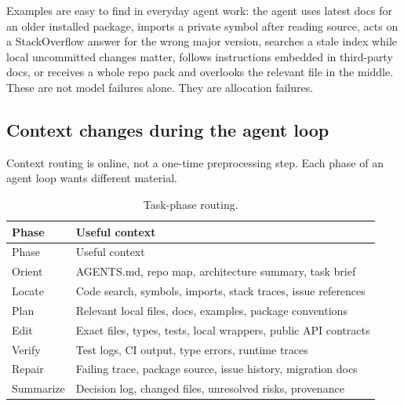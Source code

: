 \documentclass[
  11pt,
  letterpaper,
  numbers=noendperiod,
  parskip=half]{scrartcl}
\begin{document}
\figureFailureModes

Examples are easy to find in everyday agent work: the agent uses latest
docs for an older installed package, imports a private symbol after
reading source, acts on a StackOverflow answer for the wrong major
version, searches a stale index while local uncommitted changes matter,
follows instructions embedded in third-party docs, or receives a whole
repo pack and overlooks the relevant file in the middle. These are not
model failures alone. They are allocation failures.

\subsection{Context changes during the agent loop}\label{sec-phases}

Context routing is online, not a one-time preprocessing step. Each phase
of an agent loop wants different material.

\begin{longtable}[]{@{}
  >{\raggedright\arraybackslash}p{}
  >{\raggedright\arraybackslash}p{}@{}}
\caption{Task-phase routing.}\label{tbl-phases}\tabularnewline
\toprule\noalign{}
\begin{minipage}[b]{\linewidth}\raggedright
Phase
\end{minipage} & \begin{minipage}[b]{\linewidth}\raggedright
Useful context
\end{minipage} \\
\midrule\noalign{}
\endfirsthead
\toprule\noalign{}
\begin{minipage}[b]{\linewidth}\raggedright
Phase
\end{minipage} & \begin{minipage}[b]{\linewidth}\raggedright
Useful context
\end{minipage} \\
\midrule\noalign{}
\endhead
\bottomrule\noalign{}
\endlastfoot
Orient & AGENTS.md, repo map, architecture summary, task brief \\
Locate & Code search, symbols, imports, stack traces, issue
references \\
Plan & Relevant local files, docs, examples, package conventions \\
Edit & Exact files, types, tests, local wrappers, public API
contracts \\
Verify & Test logs, CI output, type errors, runtime traces \\
Repair & Failing trace, package source, issue history, migration docs \\
Summarize & Decision log, changed files, unresolved risks, provenance \\
\end{longtable}
\end{document}
